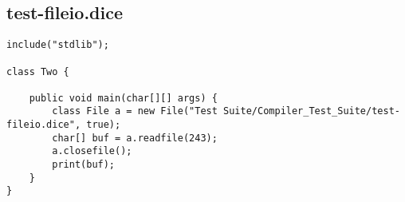 \subsection{test-fileio.dice}
\begin{verbatim}
include("stdlib");

class Two {

	public void main(char[][] args) {
        class File a = new File("Test Suite/Compiler_Test_Suite/test-fileio.dice", true);
        char[] buf = a.readfile(243);
        a.closefile();
        print(buf);
	}
}

\end{verbatim}